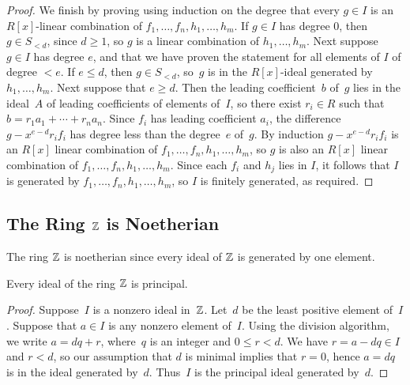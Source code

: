\begin{proof}
We finish by proving using induction on the degree that every $g\in I$ is an
$R[x]$-linear combination of $f_1,\dots, f_n, h_1,\dots, h_m$.
If $g\in I$ has degree $0$, then $g \in S_{<d}$, since $d\geq 1$, so
$g$ is a linear combination of $h_1,\dots, h_m$.  Next suppose
$g\in I$ has degree $e$, and that we have proven the statement
for all elements of $I$ of degree $<e$.
If $e\leq d$, then $g\in S_{<d}$, so~$g$ is
in the $R[x]$-ideal generated by $h_1,\dots, h_m$.  Next suppose
that $e\geq d$.  Then the leading coefficient~$b$
of~$g$ lies in the ideal~$A$ of leading coefficients of elements of~$I$, so there
exist $r_i\in R$ such that $b=r_1 a_1 + \cdots + r_n a_n$.  Since
$f_i$ has leading coefficient $a_i$, the difference $g- x^{e-d} r_i
f_i$ has degree less than the degree~$e$ of~$g$.  By induction $g-
x^{e-d} r_i f_i$ is an $R[x]$ linear combination of $f_1,\dots, f_n,
h_1,\dots, h_m$, so $g$ is also an $R[x]$ linear combination of
$f_1,\dots, f_n, h_1,\dots, h_m$.  Since each $f_i$ and $h_j$ lies in
$I$, it follows that $I$ is generated by $f_1,\dots, f_n, h_1,\dots,
h_m$, so $I$ is finitely generated, as required.
\end{proof}

\subsection{The Ring $\mathbb{Z}$ is Noetherian}\label{sec:Znoeth}

The ring $\mathbb{Z}$ is noetherian since every ideal of $\mathbb{Z}$ is
generated by one element.
\begin{proposition}\label{prop:zpid}
  Every ideal of the ring $\mathbb{Z}$ is principal.
\end{proposition}
\begin{proof}
  Suppose~$I$ is a nonzero ideal in~$\mathbb{Z}$. Let~$d$ be the least positive
  element of~$I$.  Suppose that $a\in I$ is any nonzero element of~$I$.
  Using the division algorithm, we write $a=dq + r$, where~$q$ is an
  integer and $0\leq r < d$.  We have $r=a-dq\in I$ and $r<d$, so our
  assumption that $d$ is minimal implies that $r=0$, hence $a=dq$ is in
  the ideal generated by~$d$. Thus~$I$ is the principal ideal generated
  by~$d$.
\end{proof}

